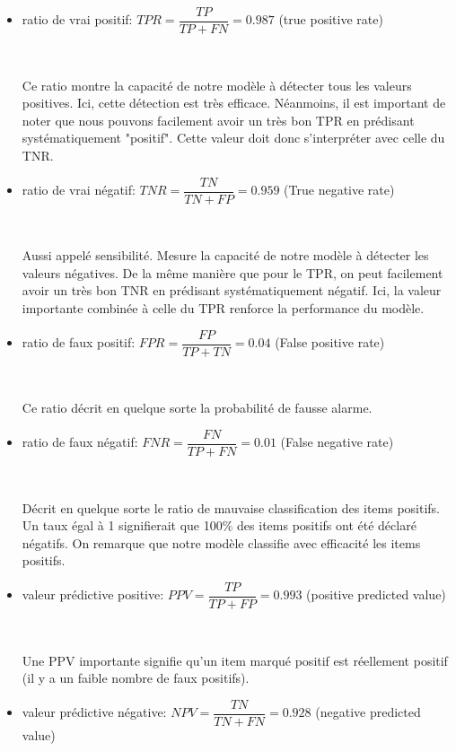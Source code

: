 \documentclass[a4paper]{report}
\begin{document}
\begin{itemize}\setlength{\itemsep}{1.5mm}
\item ratio de vrai positif: $TPR=\dfrac{TP}{TP+FN}=0.987$  (true positive rate)

~\par

Ce ratio montre la capacité de notre modèle à détecter tous les valeurs positives. Ici, cette détection est très efficace. Néanmoins, il est important de noter que nous pouvons facilement avoir un très bon TPR en prédisant systématiquement "positif". Cette valeur doit donc s'interpréter avec celle du TNR. 

\item ratio de vrai négatif: $TNR=\dfrac{TN}{TN+FP} = 0.959$ (True negative rate)

~\par

Aussi appelé sensibilité. Mesure la capacité de notre modèle à détecter les valeurs négatives. De la même manière que pour le TPR, on peut facilement avoir un très bon TNR en prédisant systématiquement négatif. Ici, la valeur importante combinée à celle du TPR renforce la performance du modèle.

\item ratio de faux positif: $FPR=\dfrac{FP}{TP+TN}=0.04$ (False positive rate)

~\par

Ce ratio décrit en quelque sorte la probabilité de fausse alarme. 

\item ratio de faux négatif: $FNR=\dfrac{FN}{TP+FN}=0.01 $ (False negative rate)

~\par

Décrit en quelque sorte le ratio de mauvaise classification des items positifs. Un taux égal à 1 signifierait que 100\% des items positifs ont été déclaré négatifs. On remarque que notre modèle classifie avec efficacité les items positifs.

\item valeur prédictive positive: $PPV=\dfrac{TP}{TP+FP}=0.993$  (positive predicted value)

~\par

Une PPV importante signifie qu'un item marqué positif est réellement positif (il y a un faible nombre de faux positifs). 

\item valeur prédictive négative: $NPV=\dfrac{TN}{TN+FN}=0.928$ (negative predicted value)


\end{itemize}
\end{document}
